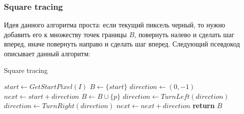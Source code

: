 \documentclass{fefu}
\begin{document}
\subsubsection{Square tracing}
Идея данного алгоритма проста: если текущий пиксель черный, то нужно добавить его к множеству точек границы $B$,
повернуть налево и сделать шаг вперед, иначе повернуть направо и сделать шаг вперед. Следующий псевдокод
описывает данный алгоритм:
\begin{algorithm}
    \caption{Square tracing}
    \begin{algorithmic}[1]
         
            \State $start \gets GetStartPixel(I)$
            \State $B \gets \{start\}$
            \State $direction \gets \left(0, -1\right)$
            \State $next \gets start + direction$
                    \State $B \gets B \cup \{p\}$
                    \State $direction \gets TurnLeft(direction)$
                \Else
                    \State $direction \gets TurnRight(direction)$
                \EndIf
                \State $next \gets next + direction$
            \EndWhile
            \State \textbf{return} $B$
        \EndProcedure
    \end{algorithmic}
\end{algorithm}
\end{document}
